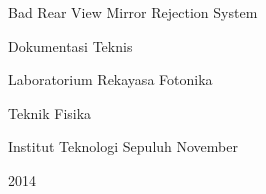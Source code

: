 \documentclass[11pt,fleqn]{book} %
\begin{document}
\begingroup
\thispagestyle{empty}
  \centering
  \vspace*{9cm}
  \par\normalfont\fontsize{35}{35}\sffamily\selectfont
  Bad Rear View Mirror Rejection System\par %
  \vspace*{1cm}
  {\Huge Dokumentasi Teknis}\par %
  \vspace*{1cm}
  {\large Laboratorium Rekayasa Fotonika}\par
  {\large Teknik Fisika}\par
  {\large Institut Teknologi Sepuluh November}\par
  {\large 2014}\par
\endgroup
\end{document}

